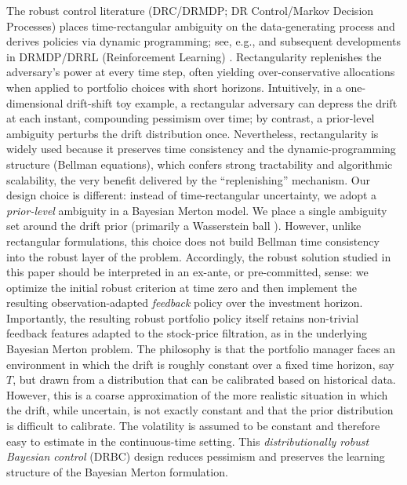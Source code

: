 \documentclass[11pt]{article}
\theoremstyle{definition}
\begin{document}
The robust control literature (DRC/DRMDP{; DR Control/Markov Decision Processes}) places time-rectangular ambiguity on the data-generating process and derives policies via dynamic programming; see, e.g., \cite{HansenSargent2001,hansen2008robustness,RB1,RB2} and subsequent developments in DRMDP/DRRL {(Reinforcement Learning)} \cite{NianSi,wang2022policy,Wang2023,Liu2022,Zhou2021,lu2024drrl}. Rectangularity replenishes the adversary's power at every time step, often yielding over-conservative allocations when applied to portfolio choices with short horizons. Intuitively, in a one-dimensional drift-shift toy example, a rectangular adversary can depress the drift at each instant, compounding pessimism over time; by contrast, a prior-level ambiguity perturbs the drift distribution once. Nevertheless, rectangularity is widely used because it preserves time consistency and the dynamic-programming structure (Bellman equations), which confers strong tractability and algorithmic scalability, the very benefit delivered by the “replenishing” mechanism. Our design choice is different: instead of time-rectangular uncertainty, we adopt a \,\emph{prior-level} ambiguity in a Bayesian Merton model. We place a single ambiguity set around the drift prior (primarily a Wasserstein ball%
). {However, unlike rectangular formulations, this choice does not build Bellman time consistency into the robust layer of the problem. Accordingly, the robust solution studied in this paper should be interpreted in an ex-ante, or pre-committed, sense: we optimize the initial robust criterion at time zero and then implement the resulting observation-adapted \textit{feedback} policy over the investment horizon. Importantly, the resulting robust portfolio policy itself retains non-trivial feedback features adapted to the stock-price filtration, as in the underlying Bayesian Merton problem. The philosophy is that the portfolio manager faces an environment in which the drift is roughly constant over a fixed time horizon, say $T$, but drawn from a distribution that can be calibrated based on historical data. However, this is a coarse approximation of the more realistic situation in which the drift, while uncertain, is not exactly constant and that the prior distribution is difficult to calibrate.}
The volatility is assumed to be constant and therefore easy to estimate in the continuous-time setting. This \emph{distributionally robust Bayesian control} (DRBC) design reduces pessimism and preserves the learning structure of the Bayesian Merton formulation.  
\end{document}
